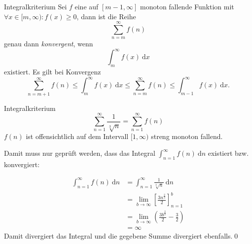 \documentclass[german]{../spicker}
\newcommand{\dx}{~\mathrm{d}x}
\newcommand{\dn}{~\mathrm{d}n}
\begin{document}
\begin{defi}{Integralkriterium}
    Sei $f$ eine auf $[m-1, \infty]$ monoton fallende Funktion mit $\forall x \in [m, \infty) : f(x) \geq 0$, dann ist die Reihe
    $$
        \sum^\infty_{n=m} f(n)
    $$
    genau dann \emph{konvergent}, wenn
    $$
        \int^\infty_m f(x) \dx
    $$
    existiert. Es gilt bei Konvergenz
    $$
        \sum^\infty_{n=m+1} f(n) \leq \int^\infty_m f(x) \dx \leq \sum^\infty_{n=m} f(n) \leq \int^\infty_{m-1} f(x) \dx.
    $$
\end{defi}

\begin{example}{Integralkriterium}
    \[
        \sum^\infty_{n=1} \frac{1}{\sqrt[3]{n}} = \sum^\infty_{n=1} f(n)
    \]
    $f(n)$ ist offensichtlich auf dem Intervall $[1, \infty )$ streng monoton fallend.

    Damit muss nur geprüft werden, dass das Integral $\int^\infty_{n=1} f(n) \dn$ existiert bzw. konvergiert:

    $$
        \begin{aligned}
            \int^\infty_{n=1} f(n) \dn
             & ={} \int^\infty_{n=1} \frac{1}{\sqrt[3]{n}} \dn                              \\
             & ={} \lim_{b\to\infty} \left[ \frac{3n^{\frac{2}{3}}}{2} \right]^b_{n=1}      \\
             & ={} \lim_{b\to\infty} \left( \frac{3b^{\frac{2}{3}}}{2} - \frac{3}{2}\right) \\
             & ={} \infty
        \end{aligned}
    $$
    Damit divergiert das Integral und die gegebene Summe divergiert ebenfalls.\qed
\end{example}

\printindex
\printindex[Beispiele]
\end{document}

